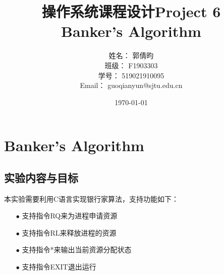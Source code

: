 \documentclass{article}
\title{\textbf{操作系统课程设计Project 6\\Banker's Algorithm}} %
\author{姓名： 郭倩昀  
\\班级： F1903303  
\\学号： 519021910095  
\\Email： guoqianyun@sjtu.edu.cn} %
\date{\today} %
\begin{document}
\maketitle %
\tableofcontents
\newpage
\section{Banker's Algorithm}
\subsection{实验内容与目标}
本实验需要利用C语言实现银行家算法，支持功能如下：
\begin{itemize}
\item[$\bullet$]支持指令RQ来为进程申请资源
\item[$\bullet$]支持指令RL来释放进程的资源
\item[$\bullet$]支持指令*来输出当前资源分配状态
\item[$\bullet$]支持指令EXIT退出运行
\end{itemize}
\end{document}
